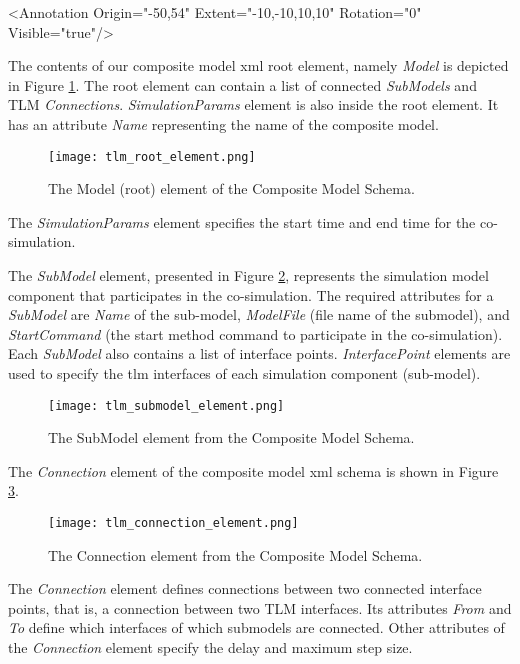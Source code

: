 <Annotation Origin="{-50,54}" Extent="{-10,-10,10,10}" Rotation="0" Visible="true"/>

The contents of our composite model \acrshort{xml} root element, namely \textit{Model} is depicted in Figure \ref{fig:tlmerootelement}. The root element can contain a list of connected \textit{SubModels} and TLM \textit{Connections}. \textit{SimulationParams} element is also inside the root element. It has an attribute \textit{Name} representing the name of the composite model.

\begin{figure}
	\texttt{[image: tlm\_root\_element.png]}
	\caption{The Model (root) element of the Composite Model Schema.}
	\label{fig:tlmerootelement}
\end{figure}


The \textit{SimulationParams} element specifies the start time and end time for the co-simulation.

The \textit{SubModel} element, presented in Figure \ref{fig:tlmsubmodelelement}, represents the simulation model component that participates in the co-simulation. The required attributes for a \textit{SubModel} are \textit{Name} of the sub-model, \textit{ModelFile} (file name of the submodel), and \textit{StartCommand} (the start method command to participate in the co-simulation). Each \textit{SubModel} also contains a list of interface points. \textit{InterfacePoint} elements are used to specify the \acrshort{tlm} interfaces of each simulation component (sub-model). 

\begin{figure}
	\texttt{[image: tlm\_submodel\_element.png]}
	\caption{The SubModel element from the Composite Model Schema.}
	\label{fig:tlmsubmodelelement}
\end{figure}

The \textit{Connection} element of the composite model \acrshort{xml} schema is shown in Figure \ref{fig:tlmconnectionelement}.

\begin{figure}
	\texttt{[image: tlm\_connection\_element.png]}
	\caption{The Connection element from the Composite Model Schema.}
	\label{fig:tlmconnectionelement}
\end{figure}

The \textit{Connection} element defines connections between two connected interface points, that is, 
a connection between two TLM interfaces. Its attributes \textit{From} and \textit{To} define which interfaces of which submodels are connected. Other attributes of the \textit{Connection} element specify the delay and maximum step size. 

